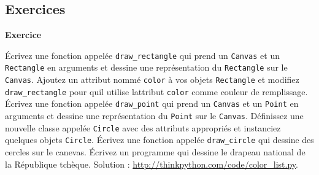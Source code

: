 \hypertarget{exercices}{%
\subsection{Exercices}\label{exercices}}

\textbf{Exercice}

Écrivez une fonction appelée \texttt{draw\_rectangle} qui prend un
\texttt{Canvas} et un \texttt{Rectangle} en arguments et dessine une
représentation du \texttt{Rectangle} sur le \texttt{Canvas}. Ajoutez un
attribut nommé \texttt{color} à vos objets \texttt{Rectangle} et
modifiez \texttt{draw\_rectangle} pour qu\textquotesingle il utilise
l\textquotesingle attribut \texttt{color} comme couleur de remplissage.
Écrivez une fonction appelée \texttt{draw\_point} qui prend un
\texttt{Canvas} et un \texttt{Point} en arguments et dessine une
représentation du \texttt{Point} sur le \texttt{Canvas}. Définissez une
nouvelle classe appelée \texttt{Circle} avec des attributs appropriés et
instanciez quelques objets \texttt{Circle}. Écrivez une fonction appelée
\texttt{draw\_circle} qui dessine des cercles sur le canevas. Écrivez un
programme qui dessine le drapeau national de la République tchèque.
Solution : \url{http://thinkpython.com/code/color_list.py}.
